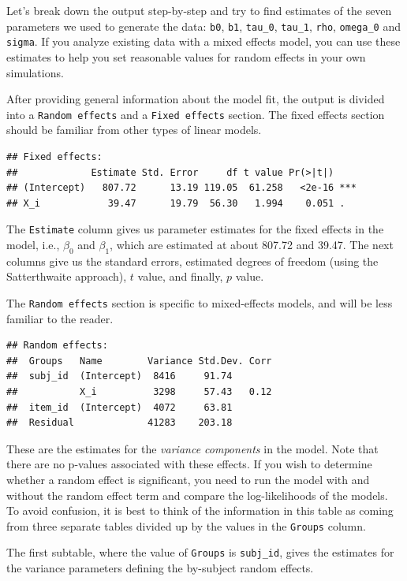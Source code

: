 \documentclass[english,doc,floatsintext]{apa6}
\begin{document}
\noindent Let's break down the output step-by-step and try to find estimates of the seven parameters we used to generate the data: \texttt{b0}, \texttt{b1}, \texttt{tau\_0}, \texttt{tau\_1}, \texttt{rho}, \texttt{omega\_0} and \texttt{sigma}. If you analyze existing data with a mixed effects model, you can use these estimates to help you set reasonable values for random effects in your own simulations.

After providing general information about the model fit, the output is divided into a \texttt{Random\ effects} and a \texttt{Fixed\ effects} section. The fixed effects section should be familiar from other types of linear models.

\begin{verbatim}
## Fixed effects:
##             Estimate Std. Error     df t value Pr(>|t|)    
## (Intercept)   807.72      13.19 119.05  61.258   <2e-16 ***
## X_i            39.47      19.79  56.30   1.994    0.051 .
\end{verbatim}

\noindent The \texttt{Estimate} column gives us parameter estimates for the fixed effects in the model, i.e., \(\beta_0\) and \(\beta_1\), which are estimated at about 807.72 and 39.47. The next columns give us the standard errors, estimated degrees of freedom (using the Satterthwaite approach), \(t\) value, and finally, \(p\) value.

The \texttt{Random\ effects} section is specific to mixed-effects models, and will be less familiar to the reader.

\begin{verbatim}
## Random effects:
##  Groups   Name        Variance Std.Dev. Corr
##  subj_id  (Intercept)  8416     91.74       
##           X_i          3298     57.43   0.12
##  item_id  (Intercept)  4072     63.81       
##  Residual             41283    203.18
\end{verbatim}

\noindent These are the estimates for the \emph{variance components} in the model. Note that there are no p-values associated with these effects. If you wish to determine whether a random effect is significant, you need to run the model with and without the random effect term and compare the log-likelihoods of the models. To avoid confusion, it is best to think of the information in this table as coming from three separate tables divided up by the values in the \texttt{Groups} column.

The first subtable, where the value of \texttt{Groups} is \texttt{subj\_id}, gives the estimates for the variance parameters defining the by-subject random effects.
\end{document}

